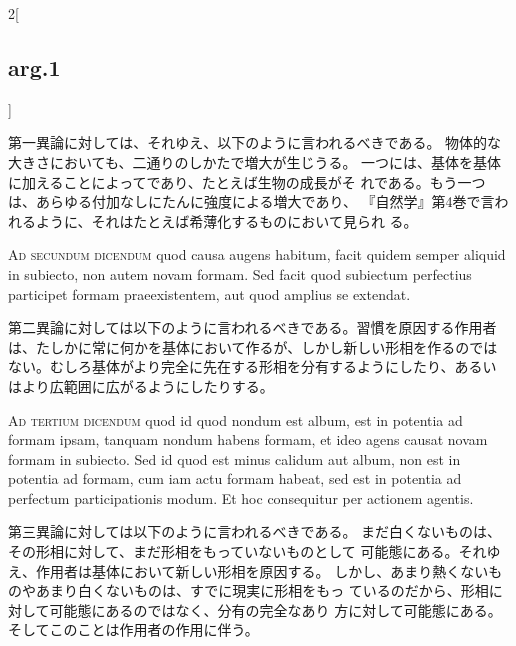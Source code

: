 \documentclass[paper=a4paper,fontsize=10pt,jafontsize=9pt,titlepage]{jlreq}
\begin{document}
\begin{paracol}{2}[\subsection{arg.1}]
\switchcolumn

第一異論に対しては、それゆえ、以下のように言われるべきである。
物体的な大きさにおいても、二通りのしかたで増大が生じうる。
一つには、基体を基体に加えることによってであり、たとえば生物の成長がそ
れである。もう一つは、あらゆる付加なしにたんに強度による増大であり、
『自然学』第4巻で言われるように、それはたとえば希薄化するものにおいて見られ
る。

\switchcolumn*[\subsection{ad.2}]

{\scshape Ad secundum dicendum} quod causa augens habitum, facit quidem semper
aliquid in subiecto, non autem novam formam. Sed facit quod subiectum
perfectius participet formam praeexistentem, aut quod amplius se
extendat.

\switchcolumn

第二異論に対しては以下のように言われるべきである。習慣を原因する作用者
は、たしかに常に何かを基体において作るが、しかし新しい形相を作るのでは
ない。むしろ基体がより完全に先在する形相を分有するようにしたり、あるい
はより広範囲に広がるようにしたりする。

\switchcolumn*[\subsection{ad.3}]

{\scshape Ad tertium dicendum} quod id quod nondum est album, est in potentia ad
formam ipsam, tanquam nondum habens formam, et ideo agens causat novam
formam in subiecto. Sed id quod est minus calidum aut album, non est
in potentia ad formam, cum iam actu formam habeat, sed est in potentia
ad perfectum participationis modum. Et hoc consequitur per actionem
agentis.

\switchcolumn

第三異論に対しては以下のように言われるべきである。
まだ白くないものは、その形相に対して、まだ形相をもっていないものとして
可能態にある。それゆえ、作用者は基体において新しい形相を原因する。
しかし、あまり熱くないものやあまり白くないものは、すでに現実に形相をもっ
 ているのだから、形相に対して可能態にあるのではなく、分有の完全なあり
 方に対して可能態にある。そしてこのことは作用者の作用に伴う。

\end{paracol}
\newpage
{}
{}
\setcounter{section}{3}
\setcounter{subsection}{0}
\end{document}
